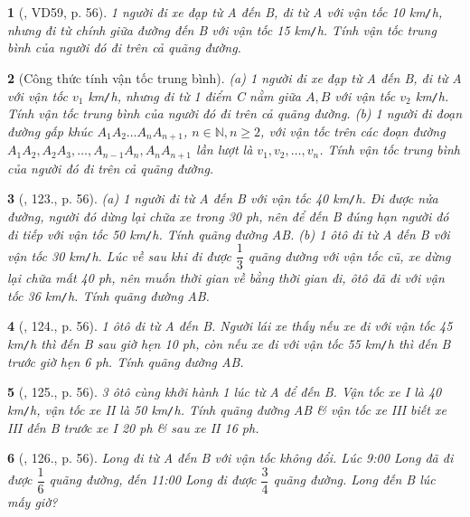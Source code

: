 \documentclass{article}
\newtheorem{baitoan}{}
\begin{document}
\begin{baitoan}[\cite{Binh_Toan_6_tap_2}, VD59, p. 56]
	1 người đi xe đạp từ A đến B, đi từ A với vận tốc {\rm10 km{\tt/}h}, nhưng đi từ chính giữa đường đến B với vận tốc {\rm15 km{\tt/}h}. Tính vận tốc trung bình của người đó đi trên cả quãng đường.
\end{baitoan}

\begin{baitoan}[Công thức tính vận tốc trung bình]
	(a) 1 người đi xe đạp từ A đến B, đi từ A với vận tốc $v_1$ {\rm km{\tt/}h}, nhưng đi từ 1 điểm C nằm giữa $A,B$ với vận tốc $v_2$ {\rm km{\tt/}h}. Tính vận tốc trung bình của người đó đi trên cả quãng đường. (b) 1 người đi đoạn đường gấp khúc $A_1A_2\ldots A_nA_{n+1}$, $n\in\mathbb{N},n\ge2$, với vận tốc trên các đoạn đường $A_1A_2,A_2A_3,\ldots,A_{n-1}A_n,A_nA_{n+1}$ lần lượt là $v_1,v_2,\ldots,v_n$. Tính vận tốc trung bình của người đó đi trên cả quãng đường.
\end{baitoan}

\begin{baitoan}[\cite{Binh_Toan_6_tap_2}, 123., p. 56]
	(a) 1 người đi từ A đến B với vận tốc {\rm40 km{\tt/}h}. Đi được nửa đường, người đó dừng lại chữa xe trong {\rm30 ph}, nên để đến B đúng hạn người đó đi tiếp với vận tốc {\rm50 km{\tt/}h}. Tính quãng đường AB. (b) 1 ôtô đi từ A đến B với vận tốc {\rm30 km{\tt/}h}. Lúc về sau khi đi được $\dfrac{1}{3}$ quãng đường với vận tốc cũ, xe dừng lại chữa mất {\rm40 ph}, nên muốn thời gian về bằng thời gian đi, ôtô đã đi với vận tốc {\rm36 km{\tt/}h}. Tính quãng đường AB.
\end{baitoan}

\begin{baitoan}[\cite{Binh_Toan_6_tap_2}, 124., p. 56]
	1 ôtô đi từ A đến B. Người lái xe thấy nếu xe đi với vận tốc {\rm45 km{\tt/}h} thì đến B sau giờ hẹn {\rm10 ph}, còn nếu xe đi với vận tốc {\rm55 km{\tt/}h} thì đến B trước giờ hẹn {\rm6 ph}. Tính quãng đường AB.
\end{baitoan}

\begin{baitoan}[\cite{Binh_Toan_6_tap_2}, 125., p. 56]
	3 ôtô cùng khởi hành 1 lúc từ A để đến B. Vận tốc xe I là {\rm40 km{\tt/}h}, vận tốc xe II là {\rm50 km{\tt/}h}. Tính quãng đường AB \& vận tốc xe III biết xe III đến B trước xe I {\rm20 ph} \& sau xe II {\rm16 ph}.
\end{baitoan}

\begin{baitoan}[\cite{Binh_Toan_6_tap_2}, 126., p. 56]
	Long đi từ A đến B với vận tốc không đổi. Lúc {\rm9:00} Long đã đi được $\dfrac{1}{6}$ quãng đường, đến {\rm11:00} Long đi được $\dfrac{3}{4}$ quãng đường. Long đến B lúc mấy giờ?
\end{baitoan}
\end{document}
